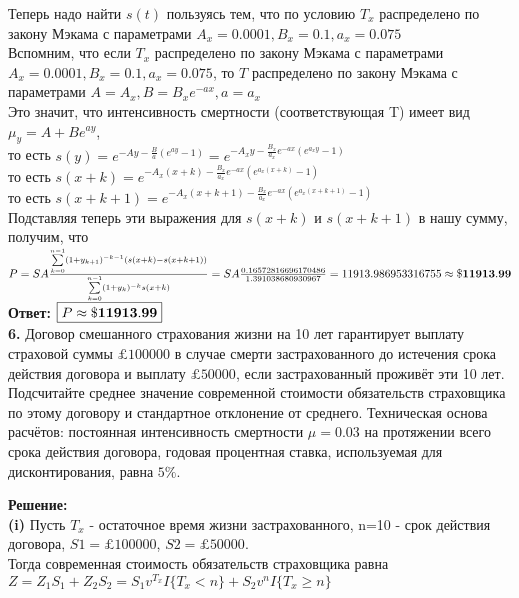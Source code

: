 \documentclass{article}
\begin{document}
Теперь надо найти $s(t)$ пользуясь тем, что по условию $T_x $ распределено по закону Мэкама с параметрами $A_x = 0.0001 , B_x = 0.1 , a_x = 0.075 $\\
Вспомним, что если  $T_x $ распределено по закону Мэкама с параметрами $A_x = 0.0001 , B_x = 0.1 , a_x = 0.075 $, 
то $T$  распределено по закону Мэкама с параметрами $A=A_x  , B = B_x e^{-ax} , a=a_x  $\\
Это значит, что интенсивность смертности (соответствующая T) имеет вид\\
 $\mu_y = A+Be^{ay}$,\\
то есть $s(y) = e^{-Ay - \frac{B}{a} (e^{ay}-1)} =  e^{-A_xy - \frac{B_x  } {a_x}   e^{-ax} (e^{a_x y}-1)} $\\
то есть $s(x+k) =  e^{-A_x(x+k) - \frac{B_x  } {a_x}   e^{-ax} (e^{a_x (x+k)}-1)} $\\
то есть $s(x+k+1) =  e^{-A_x(x+k+1) - \frac{B_x  } {a_x}   e^{-ax} (e^{a_x (x+k+1)}-1)} $\\
Подставляя теперь эти выражения для $s(x+k)$ и $s(x+k+1)$ в нашу сумму, получим, что\\
$P= SA \frac{ \sum\limits_{k=0}^{n-1}  (1+y_{k+1})^{-k-1}  (s(x+k)-s(x+k+1)) }{  \sum\limits_{k=0}^{n-1} (1+y_{k})^{-k}  s(x+k) } = 
SA\frac{ 0.16572816696170486 }{ 1.391038680930967 } = 11913.986953316755 \approx \bf \$ 11913.99$\\
 {\bf \large  Ответ:} $\boxed {P \approx \bf \$ 11913.99}$\\



 
 
{\bf \large 6.} Договор смешанного страхования жизни на 10 лет гарантирует выплату страховой суммы $\pounds 100000$ в случае смерти застрахованного до истечения срока действия договора и выплату $\pounds50000$, если застрахованный проживёт эти 10 лет. Подсчитайте среднее значение современной стоимости обязательств страховщика по этому договору и стандартное отклонение от среднего. Техническая основа расчётов: постоянная интенсивность смертности $\mu=0.03$ на протяжении всего срока действия договора, годовая процентная ставка, используемая для дисконтирования, равна $5\%$.

{\bf \large Решение:}\\
 {\bf \large  (i)} Пусть $T_x$ - остаточное время жизни застрахованного, n=10 - срок действия договора, $S1=\pounds 100000$, $S2=\pounds50000$.\\
Тогда современная стоимость обязательств страховщика равна \\
$Z=Z_1 S_1+Z_2 S_2 = S_1  v^{T_x}  I\{ T_x < n\} +   S_2 v^{n}  I\{ T_x \geq n\} $\\
\end{document}
